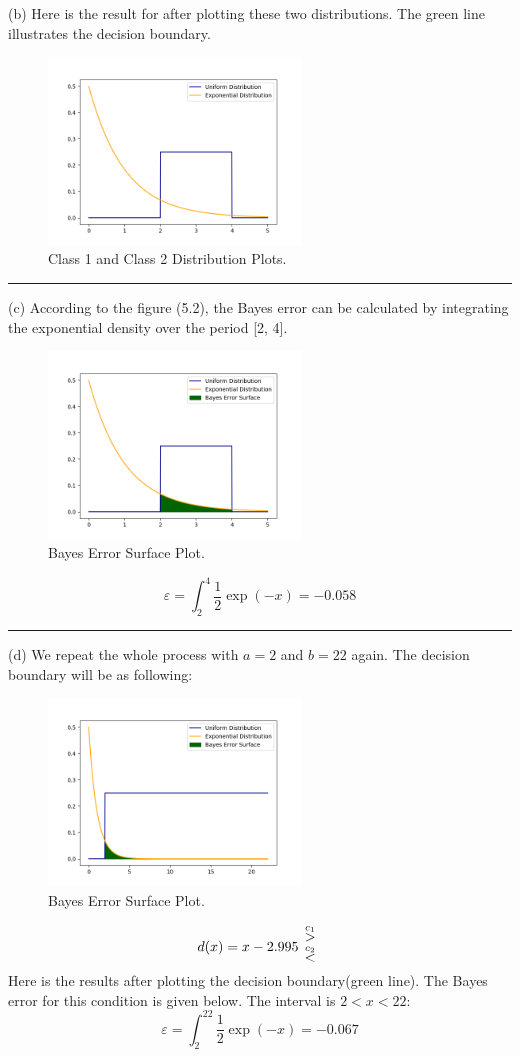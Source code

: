 \documentclass[12pt]{article}
\numberwithin{equation}{section}
\numberwithin{table}{section}
\numberwithin{figure}{section}
\newcommand{\eps}{\varepsilon}
\newcommand*{\bfrac}[2]{\genfrac{}{}{0pt}{}{#1}{#2}}
\begin{document}
(b) Here is the result for after plotting these two distributions. The green line illustrates the decision boundary.
\begin{figure}[!h]\centering
	\includegraphics[width=0.6\textwidth]{5_2.png}
	\caption{Class 1 and Class 2 Distribution Plots.}
	\label{pl1}
\end{figure}

\noindent\rule{\textwidth}{.5pt}
(c) According to the figure (5.2), the Bayes error can be calculated by integrating the exponential density over the period [2, 4].
\begin{figure}[!h]\centering
	\includegraphics[width=0.6\textwidth]{5_3.png}
	\caption{Bayes Error Surface Plot.}
	\label{pl1}
\end{figure}
$$
	\eps = \int_{2}^{4}\frac{1}{2}\exp(-x) = -0.058
$$

\noindent\rule{\textwidth}{.5pt}
(d) We repeat the whole process with $a=2$ and $b=22$ again. The decision boundary will be as following:
\begin{figure}[!h]\centering
	\includegraphics[width=0.6\textwidth]{5_4.png}
	\caption{Bayes Error Surface Plot.}
	\label{pl1}
\end{figure}
$$
	d(x) = x - 2.995\  \bfrac{\overset{c_1}{>}}{\overset{c_2}{<}}\
$$
Here is the results after plotting the decision boundary(green line).
The Bayes error for this condition is given below. The interval is $2 < x < 22$:
$$
	\eps = \int_{2}^{22}\frac{1}{2}\exp(-x) = -0.067
$$
\end{document}
